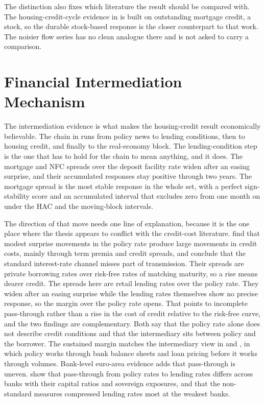 The distinction also fixes which literature the result should be compared with. The housing-credit-cycle evidence in \textcite{JordaSchularickTaylor2016} is built on outstanding mortgage credit, a stock, so the durable stock-based response is the closer counterpart to that work. The noisier flow series has no clean analogue there and is not asked to carry a comparison.

\section{Financial Intermediation Mechanism}

The intermediation evidence is what makes the housing-credit result economically believable. The chain in  runs from policy news to lending conditions, then to housing credit, and finally to the real-economy block. The lending-condition step is the one that has to hold for the chain to mean anything, and it does. The mortgage and NFC spreads over the deposit facility rate widen after an easing surprise, and their accumulated responses stay positive through two years. The mortgage spread is the most stable response in the whole set, with a perfect sign-stability score and an accumulated interval that excludes zero from one month on under the HAC and the moving-block intervals.

The direction of that move needs one line of explanation, because it is the one place where the thesis appears to conflict with the credit-cost literature. \textcite{GertlerKaradi2015} find that modest surprise movements in the policy rate produce large movements in credit costs, mainly through term premia and credit spreads, and conclude that the standard interest-rate channel misses part of transmission. Their spreads are private borrowing rates over risk-free rates of matching maturity, so a rise means dearer credit. The spreads here are retail lending rates over the policy rate. They widen after an easing surprise while the lending rates themselves show no precise response, so the margin over the policy rate opens. That points to incomplete pass-through rather than a rise in the cost of credit relative to the risk-free curve, and the two findings are complementary. Both say that the policy rate alone does not describe credit conditions and that the intermediary sits between policy and the borrower. The sustained margin matches the intermediary view in \textcite{AdrianShin2010} and \textcite{BorioZhu2012}, in which policy works through bank balance sheets and loan pricing before it works through volumes. Bank-level euro-area evidence adds that pass-through is uneven. \textcite{AltavillaCanovaCiccarelli2020} show that pass-through from policy rates to lending rates differs across banks with their capital ratios and sovereign exposures, and that the non-standard measures compressed lending rates most at the weakest banks.

